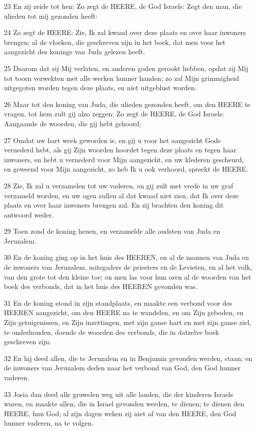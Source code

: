 \par 23 En zij zeide tot hen: Zo zegt de HEERE, de God Israels: Zegt den man, die ulieden tot mij gezonden heeft:
\par 24 Zo zegt de HEERE: Zie, Ik zal kwaad over deze plaats en over haar inwoners brengen; al de vloeken, die geschreven zijn in het boek, dat men voor het aangezicht des konings van Juda gelezen heeft.
\par 25 Daarom dat zij Mij verlaten, en anderen goden gerookt hebben, opdat zij Mij tot toorn verwekten met alle werken hunner handen; zo zal Mijn grimmigheid uitgegoten worden tegen deze plaats, en niet uitgeblust worden.
\par 26 Maar tot den koning van Juda, die ulieden gezonden heeft, om den HEERE te vragen, tot hem zult gij alzo zeggen: Zo zegt de HEERE, de God Israels: Aangaande de woorden, die gij hebt gehoord;
\par 27 Omdat uw hart week geworden is, en gij u voor het aangezicht Gods vernederd hebt, als gij Zijn woorden hoordet tegen deze plaats en tegen haar inwoners, en hebt u vernederd voor Mijn aangezicht, en uw klederen gescheurd, en geweend voor Mijn aangezicht, zo heb Ik u ook verhoord, spreekt de HEERE.
\par 28 Zie, Ik zal u verzamelen tot uw vaderen, en gij zult met vrede in uw graf verzameld worden, en uw ogen zullen al dat kwaad niet zien, dat Ik over deze plaats en over haar inwoners brengen zal. En zij brachten den koning dit antwoord weder.
\par 29 Toen zond de koning henen, en verzamelde alle oudsten van Juda en Jeruzalem.
\par 30 En de koning ging op in het huis des HEEREN, en al de mannen van Juda en de inwoners van Jeruzalem, mitsgaders de priesters en de Levieten, en al het volk, van den grote tot den kleine toe; en men las voor hun oren al de woorden van het boek des verbonds, dat in het huis des HEEREN gevonden was.
\par 31 En de koning stond in zijn standplaats, en maakte een verbond voor des HEEREN aangezicht, om den HEERE na te wandelen, en om Zijn geboden, en Zijn getuigenissen, en Zijn inzettingen, met zijn ganse hart en met zijn ganse ziel, te onderhouden, doende de woorden des verbonds, die in datzelve boek geschreven zijn.
\par 32 En hij deed allen, die te Jeruzalem en in Benjamin gevonden werden, staan; en de inwoners van Jeruzalem deden naar het verbond van God, den God hunner vaderen.
\par 33 Josia dan deed alle gruwelen weg uit alle landen, die der kinderen Israels waren, en maakte allen, die in Israel gevonden werden, te dienen; te dienen den HEERE, hun God; al zijn dagen weken zij niet af van den HEERE, den God hunner vaderen, na te volgen.

